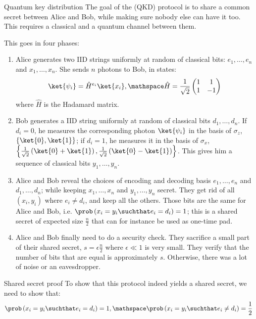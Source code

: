 \documentclass[a4paper]{article}
\begin{document}
\begin{parag}{Quantum key distribution}
    The goal of the  (QKD) protocol is to share a common secret between Alice and Bob, while making sure nobody else can have it too. This requires a classical and a quantum channel between them.

    This goes in four phases:
    \begin{enumerate}
        \item Alice generates two IID strings uniformly at random of classical bits: $e_1, \ldots, e_n$ and $x_1, \ldots, x_n$. She sends $n$ photons to Bob, in states: 
        \[\ket{\psi_i} = \hat{H}^{e_i} \ket{x_i}, \mathspace \hat{H} = \frac{1}{\sqrt{2}} \begin{pmatrix} 1 & 1 \\ 1 & -1 \end{pmatrix} \]
        where $\hat{H}$ is the Hadamard matrix.
        \item Bob generates a IID string uniformly at random of classical bits $d_1, \ldots, d_n$. If $d_i = 0$, he measures the corresponding photon $\ket{\psi_i}$ in the basis of $\sigma_z$, $\left\{\ket{0}, \ket{1}\right\}$; if $d_i = 1$, he measures it in the basis of $\sigma_x$, $\left\{\frac{1}{\sqrt{2}}\left(\ket{0} + \ket{1}\right), \frac{1}{\sqrt{2}}\left(\ket{0} - \ket{1}\right)\right\}$. This gives him a sequence of classical bits $y_1, \ldots, y_n$.
        \item Alice and Bob reveal the choices of encoding and decoding basis $e_1, \ldots, e_n$ and $d_1, \ldots, d_n$; while keeping $x_1, \ldots, x_n$ and $y_1, \ldots, y_n$ secret. They get rid of all $\left(x_i, y_i\right)$ where $e_i \neq d_i$, and keep all the others. Those bits are the same for Alice and Bob, i.e. $\prob\left(x_i = y_i \suchthat e_i = d_i\right) = 1$; this is a shared secret of expected size $\frac{n}{2}$ that can for instance be used as one-time pad.
        \item Alice and Bob finally need to do a security check. They sacrifice a small part of their shared secret, $s = \epsilon \frac{n}{2}$ where $\epsilon \ll 1$ is very small. They verify that the number of bits that are equal is approximately $s$. Otherwise, there was a lot of noise or an eavesdropper.
    \end{enumerate}
    
    \begin{subparag}{Shared secret proof}
        To show that this protocol indeed yields a shared secret, we need to show that: 
        \[\prob\left(x_i = y_i \suchthat e_i = d_i\right) = 1, \mathspace \prob\left(x_i = y_i \suchthat e_i \neq d_i\right) = \frac{1}{2}\]
        

\end{subparag}
\end{parag}
\end{document}
